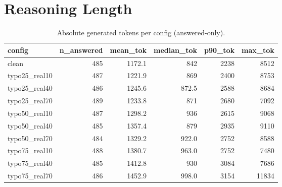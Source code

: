 \documentclass[11pt]{article}
\begin{document}
\section*{Reasoning Length}
\begin{table}[H]
\centering
\caption{Absolute generated tokens per config (answered-only).}
\small
\begin{adjustbox}{max width=\textwidth}
\begin{tabular}{lrrrrr}
\toprule
\textbf{config} & \textbf{n\_answered} & \textbf{mean\_tok} & \textbf{median\_tok} & \textbf{p90\_tok} & \textbf{max\_tok} \\
\midrule
clean & 485 & 1172.1 & 842 & 2238 & 8512 \\
typo25\_real10 & 487 & 1221.9 & 869 & 2400 & 8753 \\
typo25\_real40 & 486 & 1245.6 & 872.5 & 2588 & 8684 \\
typo25\_real70 & 489 & 1233.8 & 871 & 2680 & 7092 \\
typo50\_real10 & 487 & 1298.2 & 936 & 2615 & 9068 \\
typo50\_real40 & 485 & 1357.4 & 879 & 2935 & 9110 \\
typo50\_real70 & 484 & 1329.2 & 922.0 & 2752 & 8588 \\
typo75\_real10 & 488 & 1380.7 & 963.0 & 2752 & 7480 \\
typo75\_real40 & 485 & 1412.8 & 930 & 3084 & 7686 \\
typo75\_real70 & 486 & 1452.9 & 998.0 & 3154 & 11834 \\
\bottomrule
\end{tabular}
\end{adjustbox}
\end{table}
\end{document}
